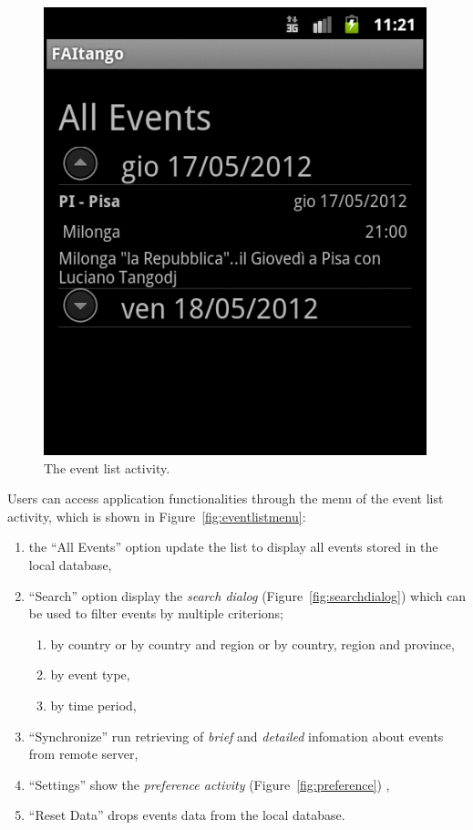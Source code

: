 \documentclass[12pt, twoside]{article}
\begin{document}
\begin{figure}[h]
\begin{center}
\includegraphics[scale=0.50]{fig/allevents-brief.png}
\end{center}
\caption{The event list activity.}
\label{fig:eventlist}
\end{figure}

Users can access application functionalities through the menu of the event list activity, which is shown in Figure~\ref{fig:eventlistmenu}:
\begin{enumerate}
	\item	the ``All Events'' option update the list to display all events stored in the local database,
	\item	``Search'' option display the \emph{search dialog} (Figure~\ref{fig:searchdialog}) 
		which can be used to filter events by multiple criterions;
		\begin{enumerate}
			\item by country or by country and region or by country, region and province,
			\item by event type,
			\item by time period,
		\end{enumerate}
	\item	``Synchronize'' run retrieving of \emph{brief} and \emph{detailed} infomation about events from remote server,
	\item	``Settings'' show the \emph{preference activity}  (Figure~\ref{fig:preference}) ,
	\item	``Reset Data'' drops events data from the local database.
\end{enumerate}
\end{document}
